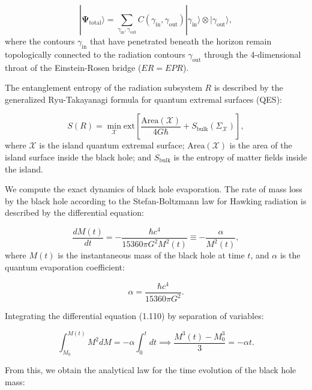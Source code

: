 \documentclass[11pt,a4paper]{article}
\theoremstyle{definition}
\begin{document}
\begin{equation}\label{eq:1.108}\tag{1.108}
|\mathbf{\Psi}_{\text{total}}\rangle = \sum_{\gamma_{\text{in}}, \gamma_{\text{out}}} C(\gamma_{\text{in}}, \gamma_{\text{out}}) |\gamma_{\text{in}}\rangle \otimes |\gamma_{\text{out}}\rangle,
\end{equation}
where the contours $\gamma_{\text{in}}$ that have penetrated beneath the horizon remain topologically connected to the radiation contours $\gamma_{\text{out}}$ through the 4-dimensional throat of the Einstein-Rosen bridge ($ER = EPR$).

The entanglement entropy of the radiation subsystem $R$ is described by the generalized Ryu-Takayanagi formula for quantum extremal surfaces (QES):

\begin{equation}\label{eq:1.109}\tag{1.109}
S(R) = \min_{\mathcal{X}} \text{ext} \left[ \frac{\text{Area}(\mathcal{X})}{4 G \hbar} + S_{\text{bulk}}(\Sigma_{\mathcal{X}}) \right],
\end{equation}
where $\mathcal{X}$ is the island quantum extremal surface; $\text{Area}(\mathcal{X})$ is the area of the island surface inside the black hole; and $S_{\text{bulk}}$ is the entropy of matter fields inside the island.

We compute the exact dynamics of black hole evaporation. The rate of mass loss by the black hole according to the Stefan-Boltzmann law for Hawking radiation is described by the differential equation:

\begin{equation}\label{eq:1.110}\tag{1.110}
\frac{dM(t)}{dt} = -\frac{\hbar c^4}{15360 \pi G^2 M^2(t)} \equiv -\frac{\alpha}{M^2(t)},
\end{equation}
where $M(t)$ is the instantaneous mass of the black hole at time $t$, and $\alpha$ is the quantum evaporation coefficient:

\begin{equation}\label{eq:1.111}\tag{1.111}
\alpha = \frac{\hbar c^4}{15360 \pi G^2}.
\end{equation}

Integrating the differential equation (1.110) by separation of variables:

\begin{equation}\label{eq:1.113}\tag{1.113}
\int_{M_0}^{M(t)} M^2 dM = -\alpha \int_0^t dt \implies \frac{M^3(t) - M_0^3}{3} = -\alpha t.
\end{equation}

From this, we obtain the analytical law for the time evolution of the black hole mass:
\end{document}
